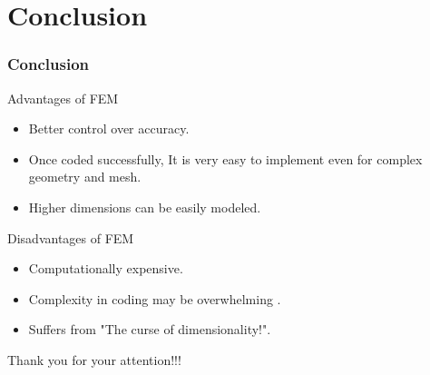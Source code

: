 \documentclass[9pt]{beamer}
\begin{document}
\section{Conclusion}
\begin{frame}
\frametitle{Conclusion}
\begin{block}{Advantages of FEM}
\begin{itemize}
\item Better control over accuracy.
\item Once coded successfully, It is very easy to implement even for complex geometry and mesh.
\item Higher dimensions can be easily modeled.
\end{itemize}

\end{block}

\begin{block}{Disadvantages of FEM}
\begin{itemize}
\item Computationally expensive.
\item Complexity in coding may be overwhelming .
\item Suffers from "The curse of dimensionality!".

\end{itemize}

\end{block}
\end{frame}

\begin{frame}
Thank you for your attention!!!
\end{frame}
\end{document}
